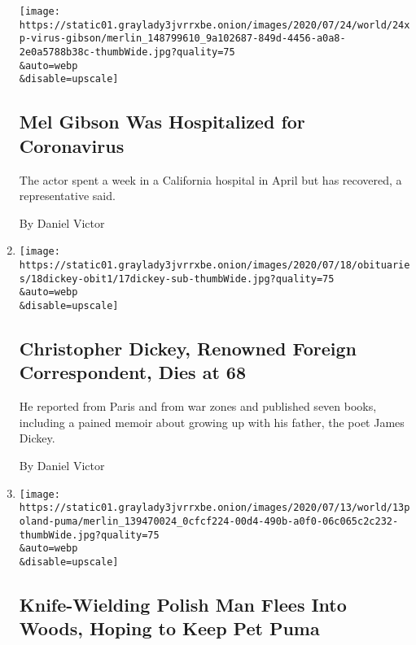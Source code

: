 \begin{enumerate}
  \texttt{[image: https://static01.graylady3jvrrxbe.onion/images/2020/07/24/world/24xp-virus-gibson/merlin\_148799610\_9a102687-849d-4456-a0a8-2e0a5788b38c-thumbWide.jpg?quality=75\\\&auto=webp\\\&disable=upscale]}

  \hypertarget{mel-gibson-was-hospitalized-for-coronavirus}{%
  \subsection{Mel Gibson Was Hospitalized for
  Coronavirus}\label{mel-gibson-was-hospitalized-for-coronavirus}}

  The actor spent a week in a California hospital in April but has
  recovered, a representative said.

  By Daniel Victor
\item
  \href{/2020/07/17/business/media/christopher-dickey-dead.html}{}

  \texttt{[image: https://static01.graylady3jvrrxbe.onion/images/2020/07/18/obituaries/18dickey-obit1/17dickey-sub-thumbWide.jpg?quality=75\\\&auto=webp\\\&disable=upscale]}

  \hypertarget{christopher-dickey-renowned-foreign-correspondent-dies-at-68}{%
  \subsection{Christopher Dickey, Renowned Foreign Correspondent, Dies
  at
  68}\label{christopher-dickey-renowned-foreign-correspondent-dies-at-68}}

  He reported from Paris and from war zones and published seven books,
  including a pained memoir about growing up with his father, the poet
  James Dickey.

  By Daniel Victor
\item
  \href{/2020/07/13/world/europe/poland-puma-kamil-stanek.html}{}

  \texttt{[image: https://static01.graylady3jvrrxbe.onion/images/2020/07/13/world/13poland-puma/merlin\_139470024\_0cfcf224-00d4-490b-a0f0-06c065c2c232-thumbWide.jpg?quality=75\\\&auto=webp\\\&disable=upscale]}

  \hypertarget{knife-wielding-polish-man-flees-into-woods-hoping-to-keep-pet-puma}{%
  \subsection{Knife-Wielding Polish Man Flees Into Woods, Hoping to Keep
  Pet
  Puma}\label{knife-wielding-polish-man-flees-into-woods-hoping-to-keep-pet-puma}}


\end{enumerate}
